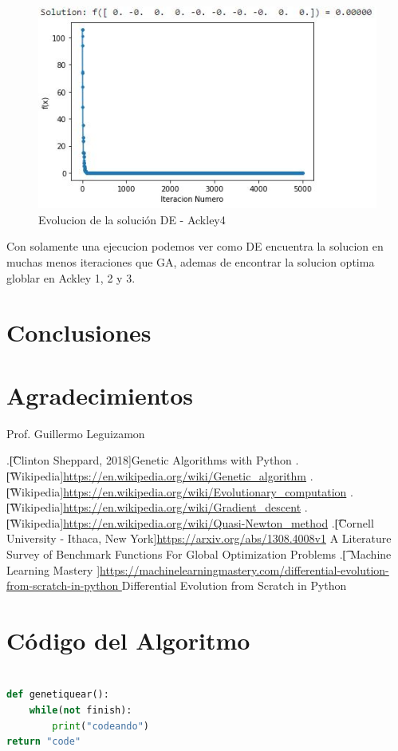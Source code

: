 \documentclass[10pt]{article}
\begin{document}
\begin{figure}[H]
\centerline{\includegraphics{ack-4-de.jpg}}
\caption{Evolucion de la solución DE - Ackley4}
\label{fig_1}
\end{figure}

Con solamente una ejecucion podemos ver como DE encuentra la solucion en muchas menos iteraciones que GA, ademas de encontrar la solucion optima globlar en Ackley 1, 2 y 3.
\section{Conclusiones}

\section*{Agradecimientos}
Prof. Guillermo Leguizamon


\begin{thebibliography}{99} %
.\t[Clinton Sheppard, 2018]{}Genetic Algorithms with Python
.\t[Wikipedia]{}\url{https://en.wikipedia.org/wiki/Genetic_algorithm}
.\t[Wikipedia]{}\url{https://en.wikipedia.org/wiki/Evolutionary_computation}
.\t[Wikipedia]{}\url{https://en.wikipedia.org/wiki/Gradient_descent}
.\t[Wikipedia]{}\url{https://en.wikipedia.org/wiki/Quasi-Newton_method}
.\t[Cornell University - Ithaca, New York]{}\url{https://arxiv.org/abs/1308.4008v1} A Literature Survey of Benchmark Functions For Global Optimization Problems
.\t[ Machine Learning Mastery ]{}\url{https://machinelearningmastery.com/differential-evolution-from-scratch-in-python } Differential Evolution from Scratch in Python


\end{thebibliography} 
 
\section{Código del Algoritmo}
\begin{lstlisting}[language=Python]

def genetiquear():
	while(not finish):
		print("codeando")
return "code"

\end{lstlisting}
\newpage
\tableofcontents
\end{document}
